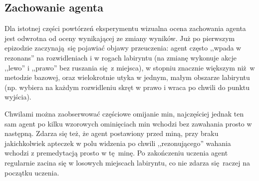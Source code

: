 \begin{figure}[H]
\end{figure}

\begin{figure}[H]
\end{figure}

\subsection {Zachowanie agenta}
Dla istotnej części powtórzeń eksperymentu wizualna ocena zachowania agenta jest odwrotna od oceny wynikającej ze zmiany wyników. Już po pierwszym epizodzie zaczynają się pojawiać objawy przeuczenia: agent często ,,wpada w rezonans'' na rozwidleniach i w rogach labiryntu (na zmianę wykonuje akcje ,,lewo'' i ,,prawo'' bez ruszania się z miejsca), w stopniu znacznie większym niż w metodzie bazowej, oraz wielokrotnie utyka w jednym, małym obszarze labiryntu (np. wybiera na każdym rozwidleniu skręt w prawo i wraca po chwili do punktu wyjścia).

Chwilami można zaobserwować częściowe omijanie min, najczęściej jednak ten sam agent po kilku wzorowych ominięciach min wchodzi bez zawahania prosto w następną. Zdarza się też, że agent postawiony przed miną, przy braku jakichkolwiek apteczek w polu widzenia po chwili ,,rezonującego'' wahania wchodzi z premedytacją prosto w tę minę. Po zakończeniu uczenia agent regularnie zacina się w losowych miejscach labiryntu, co nie zdarza się raczej na początku uczenia.

